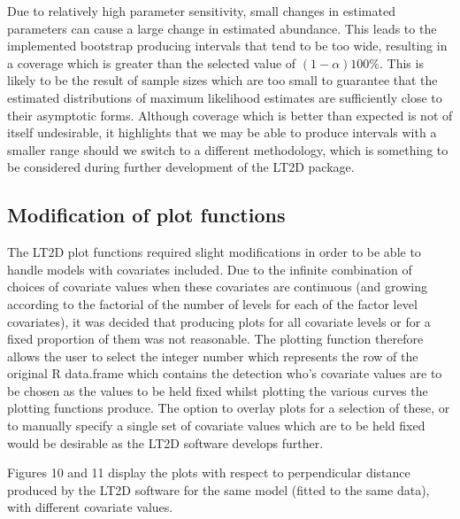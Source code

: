 \documentclass[11pt]{article}
\begin{document}
\begin{multicols}{2}
Due to relatively high parameter sensitivity, small changes in estimated parameters can cause a large change in estimated abundance. This leads to the implemented bootstrap producing intervals that tend to be too wide, resulting in a coverage which is greater than the selected value of $(1-\alpha) 100\%$. This is likely to be the result of sample sizes which are too small to guarantee that the estimated distributions of maximum likelihood estimates are sufficiently close to their asymptotic forms. Although coverage which is better than expected is not of itself undesirable, it highlights that we may be able to produce intervals with a smaller range should we switch to a different methodology, which is something to be considered during further development of the LT2D package. 


\subsection{Modification of plot functions}
The LT2D plot functions required slight modifications in order to be able to handle models with covariates included. Due to the infinite combination of choices of covariate values when these covariates are continuous (and growing according to the factorial of the number of levels for each of the factor level covariates), it was decided that producing plots for all covariate levels or for a fixed proportion of them was not reasonable. The plotting function therefore allows the user to select the integer number which represents the row of the original R data.frame which contains the detection who's covariate values are to be chosen as the values to be held fixed whilst plotting the various curves the plotting functions produce.  The option to overlay plots for a selection of these, or to manually specify a single set of covariate values which are to be held fixed would be desirable as the LT2D software develops further.

Figures 10 and 11 display the plots with respect to perpendicular distance produced by the LT2D software for the same model (fitted to the same data), with different covariate values. 



\end{multicols}
\end{document}
